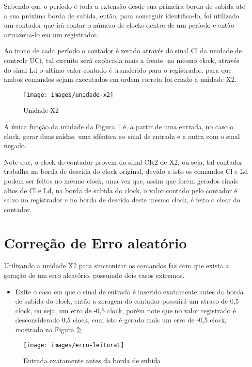 Sabendo que o período é toda a extensão desde sua primeira
borda de subida até a sua próxima borda de subida, então, para conseguir identifica-lo, foi utilizado um contador que irá contar o número de clocks dentro de um período e então armazena-lo em um registrador.

Ao inicio de cada período o contador é zerado através do sinal Cl da unidade de controle UCf, tal circuito será explicada mais a frente. no mesmo clock, através do sinal Ld o ultimo valor contado é transferido para o registrador, para que ambos comandos sejam executados em ordem correta foi criado a unidade X2.

\begin{figure}[!htp]
	\centering
	\caption{Unidade X2}
	\texttt{[image: images/unidade-x2]}
	\label{fig:unidade-x2}
\end{figure}

A única função da unidade da Figura \ref{fig:unidade-x2} é, a partir de uma entrada, no caso o clock, gerar duas saídas, uma idêntica ao sinal de entrada e a outra com o sinal negado.

Note que, o clock do contador provem do sinal CK2 de X2, ou seja, tal contador trabalha na borda de descida do clock original, devido a isto os comandos Cl e Ld podem ser feitos no mesmo clock, uma vez que, assim que forem gerados sinais altos de Cl e Ld, na borda de subida do clock, o valor contado pelo contador é salvo no registrador e no borda de descida deste mesmo clock, é feito o clear do contador.

\section{Correção de Erro aleatório}

Utilizando a unidade X2 para sincronizar os comandos faz com que exista a geração de um erro aleatório, possuindo dois casos extremos.

\begin{itemize}	
	\item Exite o caso em que o sinal de entrada é inserido exatamente antes da borda de subida do clock, então a zeragem do contador possuirá um atraso de 0,5 clock, ou seja, um erro de -0,5 clock, porém note que no valor registrado é desconsiderado 0,5 clock, com isto é gerado mais um erro de -0,5 clock, mostrado na Figura \ref{fig:erro-leitura1};
\end{itemize}

\begin{figure}[!htp]
	\centering
	\caption{Entrada exatamente antes da borda de subida}
	\texttt{[image: images/erro-leitura1]}
	\label{fig:erro-leitura1}
\end{figure}

